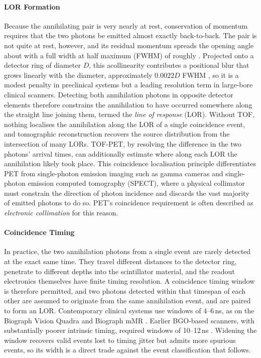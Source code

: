 \paragraph{LOR Formation}
Because the annihilating pair is very nearly at rest, conservation of momentum requires that the two photons be emitted almost exactly back-to-back.
The pair is not quite at rest, however, and its residual momentum spreads the opening angle about  with a full width at half maximum (FWHM) of roughly  \cite{Colombino1965}.
Projected onto a detector ring of diameter $D$, this acollinearity contributes a positional blur that grows linearly with the diameter, approximately $0.0022D$ FWHM , so it is a modest penalty in preclinical systems but a leading resolution term in large-bore clinical scanners.
Detecting both annihilation photons in opposite detector elements therefore constrains the annihilation to have occurred somewhere along the straight line joining them, termed the \emph{line of response} (LOR).
Without TOF, nothing localises the annihilation along the LOR of a single coincidence event, and tomographic reconstruction recovers the source distribution from the intersection of many LORs.
TOF-PET, by resolving the difference in the two photons' arrival times, can additionally estimate where along each LOR the annihilation likely took place.
This coincidence localisation principle differentiates PET from single-photon emission imaging such as gamma cameras and single-photon emission computed tomography (SPECT), where a physical collimator must constrain the direction of photon incidence and discards the vast majority of emitted photons to do so.
PET's coincidence requirement is often described as \emph{electronic collimation} for this reason.

\paragraph{Coincidence Timing}
In practice, the two annihilation photons from a single event are rarely detected at the exact same time.
They travel different distances to the detector ring, penetrate to different depths into the scintillator material, and the readout electronics themselves have finite timing resolution.
A coincidence timing window is therefore permitted, and two photons detected within that timespan of each other are assumed to originate from the same annihilation event, and are paired to form an LOR.
Contemporary clinical systems use windows of 4--6\,ns, as on the Biograph Vision Quadra \cite{Prenosil2022} and Biograph mMR \cite{Karlberg2016}.
Earlier BGO-based scanners, with substantially poorer intrinsic timing, required windows of 10--12\,ns .
Widening the window recovers valid events lost to timing jitter but admits more spurious events, so its width is a direct trade against the event classification that follows.

